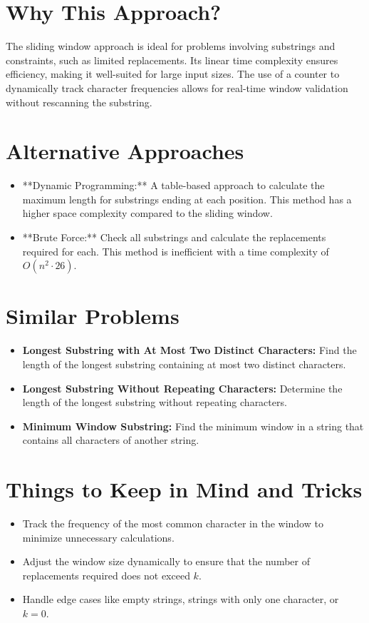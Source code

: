 \section*{Why This Approach?}
The sliding window approach is ideal for problems involving substrings and constraints, such as limited replacements. Its linear time complexity ensures efficiency, making it well-suited for large input sizes. The use of a counter to dynamically track character frequencies allows for real-time window validation without rescanning the substring.

\section*{Alternative Approaches}
\begin{itemize}
    \item **Dynamic Programming:**  
    A table-based approach to calculate the maximum length for substrings ending at each position. This method has a higher space complexity compared to the sliding window.
    \item **Brute Force:**  
    Check all substrings and calculate the replacements required for each. This method is inefficient with a time complexity of \(O(n^2 \cdot 26)\).
\end{itemize}

\section*{Similar Problems}
\begin{itemize}
    \item \textbf{Longest Substring with At Most Two Distinct Characters:} Find the length of the longest substring containing at most two distinct characters.
    \item \textbf{Longest Substring Without Repeating Characters:} Determine the length of the longest substring without repeating characters.
    \item \textbf{Minimum Window Substring:} Find the minimum window in a string that contains all characters of another string.
\end{itemize}

\section*{Things to Keep in Mind and Tricks}
\begin{itemize}
    \item Track the frequency of the most common character in the window to minimize unnecessary calculations.
    \item Adjust the window size dynamically to ensure that the number of replacements required does not exceed \( k \).
    \item Handle edge cases like empty strings, strings with only one character, or \( k = 0 \).
\end{itemize}


